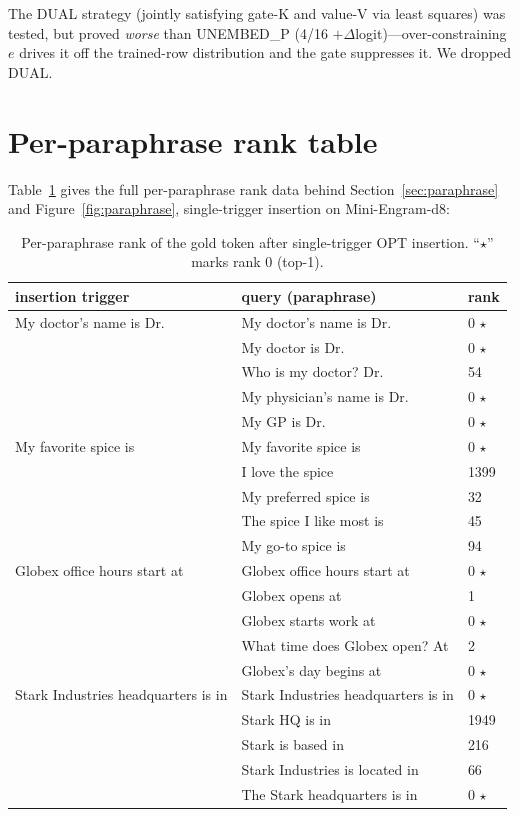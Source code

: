 \documentclass[letterpaper]{article} %
\begin{document}
The DUAL strategy (jointly satisfying gate-K and value-V via
least squares) was tested, but proved \emph{worse} than
UNEMBED\_P (4/16 $+\Delta$logit)---over-constraining $e$ drives
it off the trained-row distribution and the gate suppresses it.
We dropped DUAL.

\section{Per-paraphrase rank table}
\label{app:paraphrase-detail}

Table~\ref{tab:paraphrase} gives the full per-paraphrase rank data
behind Section~\ref{sec:paraphrase}
and Figure~\ref{fig:paraphrase}, single-trigger insertion on
Mini-Engram-d8:

\begin{table}[t]
  \centering
  \caption{Per-paraphrase rank of the gold token after single-trigger
  OPT insertion. ``$\star$'' marks rank 0 (top-1).}
  \label{tab:paraphrase}
  \footnotesize
  \begin{tabular}{lll}
    \toprule
    insertion trigger & query (paraphrase) & rank \\
    \midrule
    My doctor's name is Dr. & My doctor's name is Dr. & 0 $\star$ \\
    & My doctor is Dr. & 0 $\star$ \\
    & Who is my doctor? Dr. & 54 \\
    & My physician's name is Dr. & 0 $\star$ \\
    & My GP is Dr. & 0 $\star$ \\
    \midrule
    My favorite spice is & My favorite spice is & 0 $\star$ \\
    & I love the spice & 1399 \\
    & My preferred spice is & 32 \\
    & The spice I like most is & 45 \\
    & My go-to spice is & 94 \\
    \midrule
    Globex office hours start at & Globex office hours start at & 0 $\star$ \\
    & Globex opens at & 1 \\
    & Globex starts work at & 0 $\star$ \\
    & What time does Globex open? At & 2 \\
    & Globex's day begins at & 0 $\star$ \\
    \midrule
    Stark Industries headquarters is in & Stark Industries headquarters is in & 0 $\star$ \\
    & Stark HQ is in & 1949 \\
    & Stark is based in & 216 \\
    & Stark Industries is located in & 66 \\
    & The Stark headquarters is in & 0 $\star$ \\
    \bottomrule
  \end{tabular}
\end{table}
\end{document}
